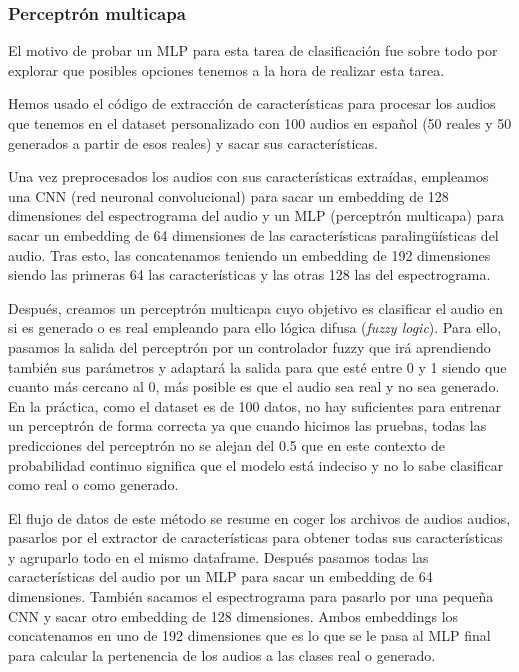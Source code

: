 \subsubsection{Perceptrón multicapa}

El motivo de probar un MLP para esta tarea de clasificación fue sobre todo por explorar que posibles opciones tenemos a la hora de realizar esta tarea.

Hemos usado el código de extracción de características para procesar los audios que tenemos en el dataset personalizado con 100 audios en español (50 reales y 50 generados a partir de esos reales) y sacar sus características. 

Una vez preprocesados los audios con sus características extraídas, empleamos una CNN (red neuronal convolucional) para sacar un embedding de 128 dimensiones del espectrograma del audio y un MLP (perceptrón multicapa) para sacar un embedding de 64 dimensiones de las características paralingüísticas del audio. Tras esto, las concatenamos teniendo un embedding de 192 dimensiones siendo las primeras 64 las características y las otras 128 las del espectrograma.

Después, creamos un perceptrón multicapa cuyo objetivo es clasificar el audio en si es generado o es real empleando para ello lógica difusa (\emph{fuzzy logic}). Para ello, pasamos la salida del perceptrón por un controlador fuzzy que irá aprendiendo también sus parámetros y adaptará la salida para que esté entre 0 y 1 siendo que cuanto más cercano al 0, más posible es que el audio sea real y no sea generado.
En la práctica, como el dataset es de 100 datos, no hay suficientes para entrenar un perceptrón de forma correcta ya que cuando hicimos las pruebas, todas las predicciones del perceptrón no se alejan del 0.5 que en este contexto de probabilidad continuo significa que el modelo está indeciso y no lo sabe clasificar como real o como generado.

El flujo de datos de este método se resume en coger los archivos de audios audios, pasarlos por el extractor de características para obtener todas sus características y agruparlo todo en el mismo dataframe. Después pasamos todas las características del audio por un MLP para sacar un embedding de 64 dimensiones. También sacamos el espectrograma para pasarlo por una pequeña CNN y sacar otro embedding de 128 dimensiones. Ambos embeddings los concatenamos en uno de 192 dimensiones que es lo que se le pasa al MLP final para calcular la pertenencia de los audios a las clases real o generado.

